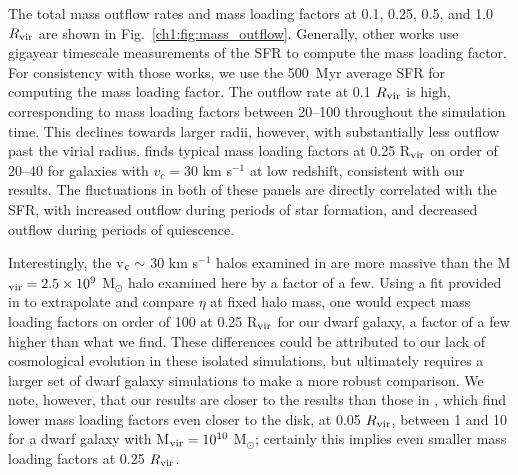 The total mass outflow rates and mass loading factors at 0.1, 0.25, 0.5, and 1.0 $R_{\rm vir}$ are shown in Fig.~\ref{ch1:fig:mass_outflow}. Generally, other works use gigayear timescale measurements of the SFR to compute the mass loading factor. For consistency with those works, we use the 500~Myr average SFR for computing the mass loading factor. The outflow rate at 0.1 $R_{\rm vir}$ is high, corresponding to mass loading factors between 20--100 throughout the simulation time. This declines towards larger radii, however, with substantially less outflow past the virial radius. \citet{Muratov2015} finds typical mass loading factors at 0.25 R$_{\rm vir}$ on order of 20--40 for galaxies with $v_{c} = 30$ km s$^{-1}$ at low redshift, consistent with our results. The fluctuations in both of these panels are directly correlated with the SFR, with increased outflow during periods of star formation, and decreased outflow during periods of quiescence.

Interestingly, the v$_{\rm c}\sim$ 30 km s$^{-1}$ halos examined in \citet{Muratov2015} are more massive than the M$_{\rm vir} = 2.5\times 10^9$ M$_{\odot}$ halo examined here by a factor of a few. Using a fit provided in \citet{Muratov2015} to extrapolate and compare $\eta$ at fixed halo mass, one would expect mass loading factors on order of 100 at 0.25 R$_{\rm vir}$ for our dwarf galaxy, a factor of a few higher than what we find. These differences could be attributed to our lack of cosmological evolution in these isolated simulations, but ultimately requires a larger set of dwarf galaxy simulations to make a more robust comparison. We note, however, that our results are closer to the \citet{Muratov2015} results than those in \citet{Hu2016,Hu2017}, which find lower mass loading factors even closer to the disk, at 0.05 $R_{\rm vir}$, between 1 and 10 for a dwarf galaxy with M$_{\rm vir} = 10^{10}$ M$_{\odot}$; certainly this implies even smaller mass loading factors at 0.25 $R_{\rm vir}$.

